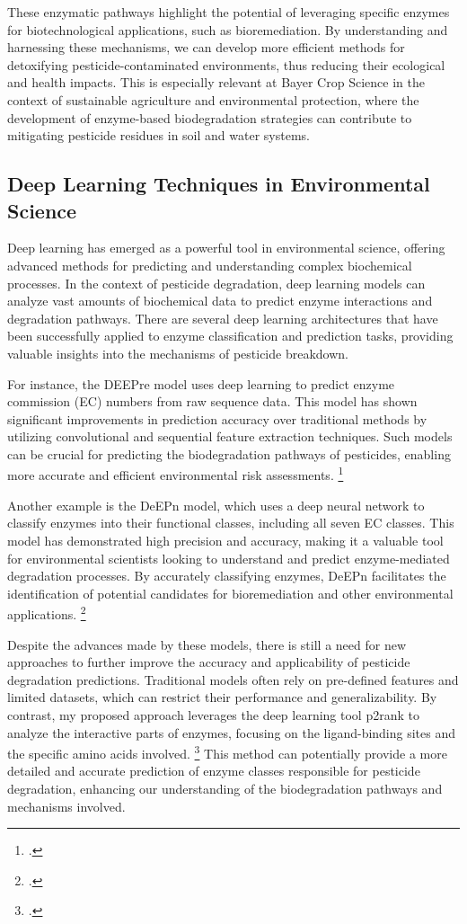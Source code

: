These enzymatic pathways highlight the potential of leveraging specific enzymes for biotechnological applications, such as bioremediation. By understanding and harnessing these mechanisms, we can develop more efficient methods for detoxifying pesticide-contaminated environments, thus reducing their ecological and health impacts. This is especially relevant at Bayer Crop Science in the context of sustainable agriculture and environmental protection, where the development of enzyme-based biodegradation strategies can contribute to mitigating pesticide residues in soil and water systems.

\subsection{Deep Learning Techniques in Environmental Science}
\label{sec:Deep Learning Techniques in Environmental Science}

Deep learning has emerged as a powerful tool in environmental science, offering advanced methods for predicting and understanding complex biochemical processes. In the context of pesticide degradation, deep learning models can analyze vast amounts of biochemical data to predict enzyme interactions and degradation pathways. There are several deep learning architectures that have been successfully applied to enzyme classification and prediction tasks, providing valuable insights into the mechanisms of pesticide breakdown.

For instance, the DEEPre model uses deep learning to predict enzyme commission (EC) numbers from raw sequence data. This model has shown significant improvements in prediction accuracy over traditional methods by utilizing convolutional and sequential feature extraction techniques. Such models can be crucial for predicting the biodegradation pathways of pesticides, enabling more accurate and efficient environmental risk assessments. \footcite{liDEEPreSequencebasedEnzyme2017}

Another example is the DeEPn model, which uses a deep neural network to classify enzymes into their functional classes, including all seven EC classes. This model has demonstrated high precision and accuracy, making it a valuable tool for environmental scientists looking to understand and predict enzyme-mediated degradation processes. By accurately classifying enzymes, DeEPn facilitates the identification of potential candidates for bioremediation and other environmental applications. \footcite{DeEPnDeepNeural}

Despite the advances made by these models, there is still a need for new approaches to further improve the accuracy and applicability of pesticide degradation predictions. Traditional models often rely on pre-defined features and limited datasets, which can restrict their performance and generalizability. By contrast, my proposed approach leverages the deep learning tool p2rank to analyze the interactive parts of enzymes, focusing on the ligand-binding sites and the specific amino acids involved. \footcite{krivakP2RankMachineLearning2018} This method can potentially provide a more detailed and accurate prediction of enzyme classes responsible for pesticide degradation, enhancing our understanding of the biodegradation pathways and mechanisms involved.